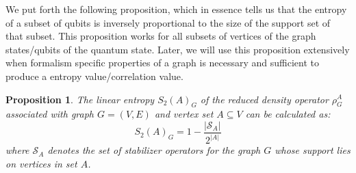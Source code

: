 \documentclass{article}
\newtheorem{prop}[theorem]{Proposition}
\newcommand{\ket}[1]{|#1\rangle}
\begin{document}



 

We put forth the following proposition, which in essence tells us that the entropy of a subset of qubits is inversely proportional to the size of the support set of that subset. This proposition works for all subsets of vertices of the graph states/qubits of the quantum state. Later, we will use this proposition extensively when formalism specific properties of a graph is necessary and sufficient to produce a entropy value/correlation value.

\begin{prop} \label{prop:calculating_linear_entropy_using_stablizer_support}
    The linear entropy  $S_2(A)_G $ of the reduced density operator $\rho^A_G$ associated with graph $ G = (V, E) $ and vertex set $ A \subseteq V$ can be calculated as:
    \begin{equation} \label{eq:calculating_linear_entropy_using_stablizer_support}
     S_2(A)_G = 1 - \frac{|\mathcal{S}_A|}{2^{|A|}}
    \end{equation}
    where $\mathcal{S}_A$ denotes the set of stabilizer operators for the graph 
$G$ whose support lies on vertices in set $A$.
    
\end{prop}
\end{document}
